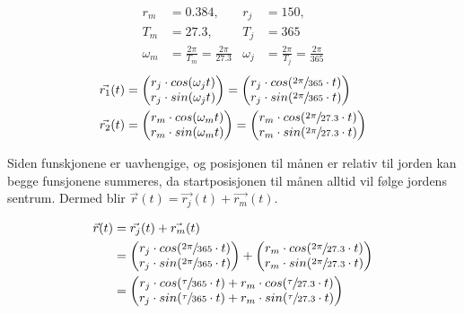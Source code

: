 \documentclass{../../myassignment}
\begin{document}
	\begin{answer}
		\begin{align*}
			r_m &= 0.384, &r_j &= 150, \\
			T_m &= 27.3, &T_j &= 365 \\
			\omega_m &= \frac{2\pi}{T_{m}} = \frac{2\pi}{27.3} & \omega_j &= \frac{2\pi}{T_{j}} = \frac{2\pi}{365}
		\end{align*}
		\begin{align*}
			\vec{r_1}(t) &= \begin{pmatrix} r_j\cdot cos(\omega_j t)\\r_j \cdot sin(\omega_j t) \end{pmatrix} = \begin{pmatrix} r_j\cdot cos(\sfrac{2\pi}{365} \cdot t)\\r_j \cdot sin(\sfrac{2\pi}{365} \cdot t) \end{pmatrix}\\
			\vec{r_2}(t) &= \begin{pmatrix} r_m\cdot cos(\omega_m t)\\r_m \cdot sin(\omega_m t) \end{pmatrix} = \begin{pmatrix} r_m\cdot cos(\sfrac{2\pi}{27.3} \cdot t)\\r_m \cdot sin(\sfrac{2\pi}{27.3} \cdot t) \end{pmatrix}\\
		\end{align*}

		Siden funskjonene er uavhengige, og posisjonen til m{\aa}nen er relativ til jorden kan begge funsjonene summeres, da startposisjonen til m{\aa}nen alltid vil f{\o}lge jordens sentrum. Dermed blir $\vec{r}(t) = \vec{r_j}(t) + \vec{r_m}(t)$.

		\begin{align*}
			\vec{r}(t) &= \vec{r_j}(t) + \vec{r_m}(t) \\
			 &= \begin{pmatrix} r_j\cdot cos(\sfrac{2\pi}{365} \cdot t)\\r_j \cdot sin(\sfrac{2\pi}{365} \cdot t) \end{pmatrix} + \begin{pmatrix} r_m\cdot cos(\sfrac{2\pi}{27.3} \cdot t)\\r_m \cdot sin(\sfrac{2\pi}{27.3} \cdot t) \end{pmatrix} \\
			 &= \begin{pmatrix} r_j\cdot cos(\sfrac{\tau}{365} \cdot t) + r_m\cdot cos(\sfrac{\tau}{27.3} \cdot t) \\ r_j \cdot sin(\sfrac{\tau}{365} \cdot t) + r_m \cdot sin(\sfrac{\tau}{27.3} \cdot t) \end{pmatrix} \\
		\end{align*}

	\end{answer}
		
\end{document}
